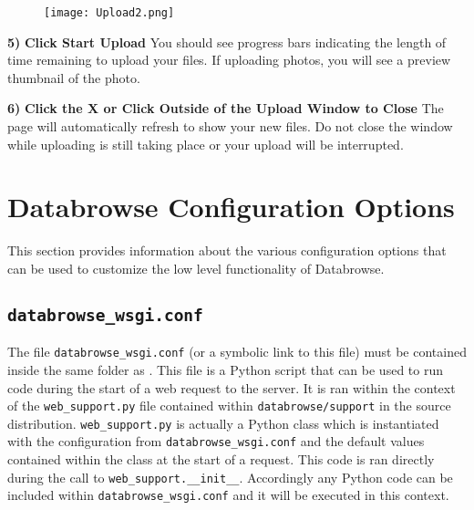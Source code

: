 \documentclass[10pt]{article}
\begin{document}
\endgroup

\hfill \break

\begingroup
\setlength\intextsep{0pt}
\begin{wrapfigure}[20]{R}{0.3\textwidth}
		\texttt{[image: Upload2.png]}
\end{wrapfigure}
\noindent\textbf{5)} \textbf{Click Start Upload} \newline You should see progress bars indicating the length of time remaining to upload your files.  If uploading photos, you will see a preview thumbnail of the photo. 

\endgroup

\hfill \break
\hfill \break
\hfill \break
\hfill \break

\begin{changemargin}{0in}{150.4pt}
\noindent\textbf{6)} \textbf{Click the X or Click Outside of the Upload Window to Close} \newline The page will automatically refresh to show your new files.  Do not close the window while uploading is still taking place or your upload will be interrupted.
\end{changemargin}


\clearpage
\section{Databrowse Configuration Options}
\label{ConfigOptions}

This section provides information about the various configuration options that can be used to customize the low level functionality of Databrowse.

\subsection{\texttt{databrowse\_wsgi.conf}}

The file \texttt{databrowse\_wsgi.conf} (or a symbolic link to this file) must be contained inside the same folder as .  This file is a Python script that can be used to run code during the start of a web request to the server.  It is ran within the context of the \texttt{web\_support.py} file contained within \texttt{databrowse/support} in the source distribution.  \texttt{web\_support.py} is actually a Python class which is instantiated with the configuration from \texttt{databrowse\_wsgi.conf} and the default values contained within the class at the start of a request.  This code is ran directly during the call to \texttt{web\_support.\_\_init\_\_}.  Accordingly any Python code can be included within \texttt{databrowse\_wsgi.conf} and it will be executed in this context.
\end{document}
